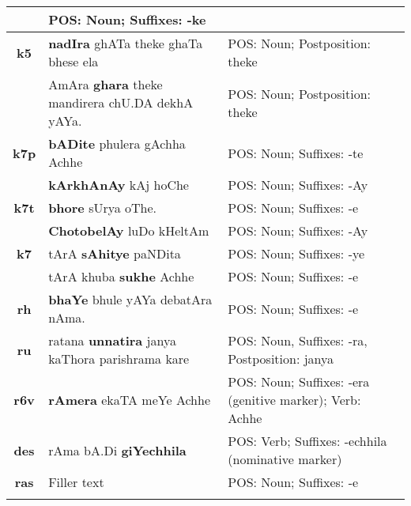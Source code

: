 \documentclass[a4 paper]{article}
\begin{document}
\begin{longtable}{cp{}p{}}
                 & POS: Noun; Suffixes: -ke\\
    \midrule
    \addlinespace[0.5em]
    \textbf{k5}
                 & \textbf{nadIra} ghATa theke ghaTa bhese ela
                 & POS: Noun; Postposition: theke\\
    \addlinespace[0.5em]
                 & AmAra \textbf{ghara} theke mandirera chU.DA dekhA yAYa.
                 & POS: Noun; Postposition: theke\\
    \midrule
    \addlinespace[0.5em]
    \textbf{k7p}
                 & \textbf{bADite} phulera gAchha Achhe
                 & POS: Noun; Suffixes: -te\\
    \addlinespace[0.5em]
                 & \textbf{kArkhAnAy} kAj hoChe
                 & POS: Noun; Suffixes: -Ay\\
    \midrule
    \addlinespace[0.5em]
    \textbf{k7t}
                 & \textbf{bhore} sUrya oThe.
                 & POS: Noun; Suffixes: -e\\
    \addlinespace[0.5em]
                 & \textbf{ChotobelAy} luDo kHeltAm
                 & POS: Noun; Suffixes: -Ay\\
    \midrule
    \addlinespace[0.5em]
    \textbf{k7}
                 & tArA \textbf{sAhitye} paNDita
                 & POS: Noun; Suffixes: -ye\\
    \addlinespace[0.5em]
                 & tArA khuba \textbf{sukhe} Achhe
                 & POS: Noun; Suffixes: -e\\
    \midrule
    \addlinespace[0.5em]
    \textbf{rh}
                 & \textbf{bhaYe} bhule yAYa debatAra nAma.
                 & POS: Noun; Suffixes: -e\\
    \midrule
    \addlinespace[0.5em]
    \textbf{ru}
                 & ratana \textbf{unnatira} janya kaThora parishrama kare
                 & POS: Noun, Suffixes: -ra, Postposition: janya\\
    \midrule
    \addlinespace[0.5em]
    \textbf{r6v}
                 & \textbf{rAmera} ekaTA meYe Achhe
                 & POS: Noun; Suffixes: -era (genitive marker); Verb: Achhe\\
    \midrule
    \addlinespace[0.5em]
    \textbf{des}
                 & rAma bA.Di \textbf{giYechhila}
                 & POS: Verb; Suffixes: -echhila (nominative marker)\\
    \midrule
    \addlinespace[0.5em]
    \textbf{ras}
                 & Filler text
                 & POS: Noun; Suffixes: -e\\
    \addlinespace[0.5em]

\end{longtable}
\end{document}
